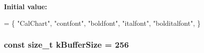 {\bfseries Initial value\-:}
\begin{DoxyCode}
=
\{
    \textcolor{stringliteral}{"CalChart"},
    \textcolor{stringliteral}{"contfont"},
    \textcolor{stringliteral}{"boldfont"},
    \textcolor{stringliteral}{"italfont"},
    \textcolor{stringliteral}{"bolditalfont"},
\}
\end{DoxyCode}
\hypertarget{a00238_a8697f12f5aa5bb2f7df98e95ada68d16}{
\subsubsection[{k\-Buffer\-Size}]{\setlength{\rightskip}{0pt plus 5cm}const size\-\_\-t k\-Buffer\-Size = 256\hspace{0.3cm}{\ttfamily [static]}}}\label{a00238_a8697f12f5aa5bb2f7df98e95ada68d16}
